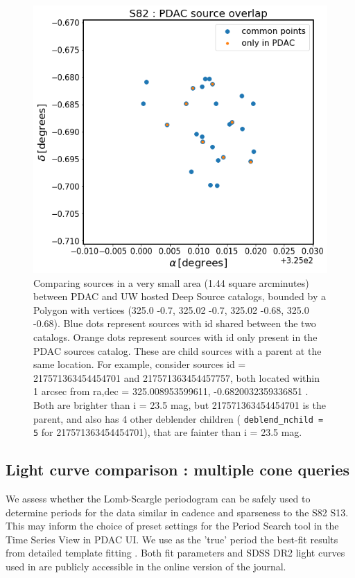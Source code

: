 \documentclass[DM,lsstdraft,toc]{lsstdoc}
\begin{document}
\begin{figure}
\includegraphics[width=\textwidth]{figs/Box_compare_sources}
\cprotect\caption{Comparing sources in a very small area (1.44 square arcminutes) between PDAC and UW hosted Deep Source catalogs, bounded by a Polygon with vertices (325.0  -0.7,  325.02  -0.7, 325.02  -0.68, 325.0   -0.68).  Blue dots represent sources with id shared between the two catalogs. Orange dots represent sources with id only present in the PDAC sources catalog. These are child sources with a parent at the same location. For example, consider sources id = 217571363454454701 and 217571363454457757, both located within 1 arcsec from ra,dec = 325.008953599611, -0.6820032359336851 . Both are brighter than i = 23.5 mag, but 217571363454454701 is the parent, and also has 4 other deblender children ( \verb|deblend_nchild = 5| for 217571363454454701), that are fainter than i = 23.5 mag.}
\label{fig:box_deblended_sources}
\end{figure}



\subsection{Light curve comparison : multiple cone queries }
\label{sec:rr_lyrae}



We assess whether the Lomb-Scargle periodogram can be safely used to determine periods for the data similar in cadence and sparseness to the  S82 S13. This may inform the choice of  preset settings for the Period Search tool in the Time Series View in PDAC UI.
We use as the 'true' period the best-fit results from detailed template fitting \citep{2010ApJ...708..717S}. Both fit parameters and  SDSS DR2 light curves used in \citep{2010ApJ...708..717S}  are publicly accessible in the online version of the journal.
\end{document}
